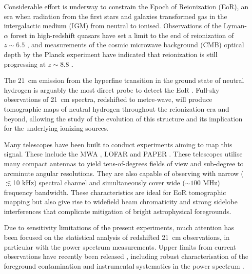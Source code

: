 \documentclass[fleqn,usenatbib]{mnras}
\begin{document}
Considerable effort is underway to constrain the Epoch of Reionization (EoR), an era when radiation from the first stars and galaxies transformed gas in the intergalactic medium (IGM) from neutral to ionised. Observations of the Lyman-$\alpha$ forest in high-redshift quasars have set a limit to the end of reionization of $z\sim6.5$ \citep{2006AJ....132..117F}, and measurements of the cosmic microwave background (CMB) optical depth by the Planck experiment have indicated that reionization is still progressing at $z\sim8.8$ \citep{2016A&A...594A..13P}.

The 21~cm emission from the hyperfine transition in the ground state of neutral hydrogen is arguably the most direct probe to detect the EoR \citep{1972A&A....20..189S,1990MNRAS.247..510S,1997ApJ...475..429M,2000ApJ...528..597T,2002ApJ...572L.123I}. Full-sky observations of 21~cm spectra, redshifted to metre-wave, will produce tomographic maps of neutral hydrogen throughout the reionization era and beyond, allowing the study of the evolution of this structure and its implication for the underlying ionizing sources.

Many telescopes have been built to conduct experiments aiming to map this signal. These include the MWA \citep[Murchison Widefield Array;][]{2013PASA...30....7T,2013PASA...30...31B}, LOFAR \citep[Low Frequency Array;][]{2013A&A...556A...2V} and PAPER \citep[Donald C. Backer Precision Array for Probing the Epoch of Reionization;][]{2010AJ....139.1468P}. These telescopes utilise many compact antennas to yield tens-of-degrees fields of view and sub-degree to arcminute angular resolutions. They are also capable of observing with narrow ($\lesssim$10 kHz) spectral channel and simultaneously cover wide ($\sim100$ MHz) frequency bandwidth. These characteristics are ideal for EoR tomographic mapping but also give rise to widefield beam chromaticity and strong sidelobe interferences that complicate mitigation of bright astrophysical foregrounds. 

Due to sensitivity limitations of the present experiments, much attention has been focused on the statistical analysis of redshifted 21~cm observations, in particular with the power spectrum measurements. Upper limits from current observations have recently been released \citep{2013MNRAS.433..639P,2014ApJ...788..106P,2014PhRvD..89b3002D,2015PhRvD..91l3011D,2015ApJ...809...61A,2015ApJ...801...51J,2016ApJ...833..102B,2017ApJ...838...65P}, including robust characterisation of the foreground contamination and instrumental systematics in the power spectrum \citep{2012ApJ...752..137M,2013ApJ...770..156H,2013ApJ...769....5J,2014PhRvD..90b3019L,2015ApJ...804...14T,2015ApJ...807L..28T,2016ApJ...825....9T}. 
\end{document}
